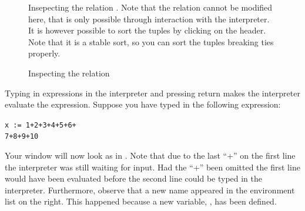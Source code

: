 \documentclass[a4,14pt,latin1]{article}
\begin{document}
\begin{figure}
  \centering
  \caption{Inspecting the relation }{Insepecting the relation . Note that the
    relation cannot be modified here, that is only possible through
    interaction with the \RAS{} interpreter. It is however possible to
    sort the tuples by clicking on the header. Note that it is a
    stable sort, so you can sort the tuples breaking ties properly.}
  \label{fig:relation_view}
\end{figure}

Typing in expressions in the interpreter and pressing return makes the
interpreter evaluate the expression. Suppose you have typed in the
following expression:

\begin{center}
{\tt x := 1+2+3+4+5+6+\\
7+8+9+10}
\end{center}

Your \RAS{} window will now look as in . Note
that due to the last ``+'' on the first line the interpreter was still
waiting for input. Had the ``+'' been omitted the first line would
have been evaluated before the second line could be typed in the
interpreter. Furthermore, observe that a new name appeared in the
environment list on the right. This happened because a new variable,
, has been defined.
\end{document}
